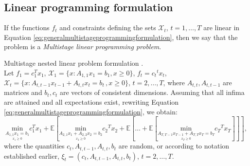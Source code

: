 \subsection{Linear programming formulation}
If the functions $f_t$ and constraints defining the sets $\mathcal{X}_t$, $t=1,\dots,T$ are linear in Equation \ref{eq:generalmultistageprogrammingformulation}, then we say that the problem is a \textit{Multistage linear programming problem}.

\begin{defn}{Multistage nested linear problem formulation \cite[Ch. 1, p. 25]{stochasticprogrammingbible}}. \\
Let $f_1=c_1^Tx_1$, $\mathcal{X}_1=\{x:A_{1,1}x_1=b_1, x \geq 0 \}$, $f_t = {c_t}^tx_t$, $\mathcal{X}_t=\{x:A_{t,t-1}x_{t-1}+A_{t,t}x_t=b_t\, , x \geq 0\}$, $t=2,\dots,T$, where $A_{t,t}, A_{t,t-1}$ are matrices and $b_t, c_t$ are vectors of consistent dimensions.  Assuming that all infima are attained and all expectations exist, rewriting Equation \ref{eq:generalmultistageprogrammingformulation}, we obtain:
\footnotesize
\begin{equation}
\label{eq:nestedlinearmultistageprogrammingformulation}
\underset{\underset{x_1 \geq 0}{A_{1,1}x_1=b_1}}{\mathrm{min}}
 c_1^Tx_1 + \mathbb{E}\left[ \underset{\underset{x_{2} \geq 0}{A_{2,1}x_{1}+A_{2,2}x_2=b_2}}{\mathrm{min}} {c_2}^Tx_2 + \mathbb{E}\left[\dots + \mathbb{E}\left[ \underset{\underset{x_{T} \geq 0}{A_{T,T-1}x_{T-1}+A_{T,T}x_T=b_T}}{\mathrm{min}} {c_T}^Tx_T\right] \right] \right],
\end{equation}
\normalsize
where the quantities $c_t, A_{t,t-1}, A_{t,t}, b_{t}$ are random, or according to notation established earlier, $\xi_t=(c_t, A_{t,t-1}, A_{t,t}, b_{t})$, $t=2,\dots,T$. 
\end{defn}

